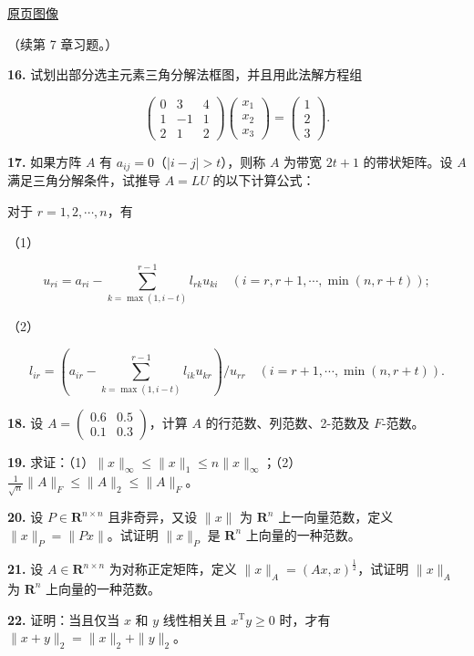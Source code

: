 \documentclass[
  10pt,
  fontset=fandol]{ctexart}
\begin{document}
\href{../../source-images/pdf-214.jpeg}{原页图像}

（续第 7 章习题。）

\textbf{16.} 试划出部分选主元素三角分解法框图，并且用此法解方程组

\[
\begin{pmatrix}0&3&4\\1&-1&1\\2&1&2\end{pmatrix}
\begin{pmatrix}x_1\\x_2\\x_3\end{pmatrix}
=\begin{pmatrix}1\\2\\3\end{pmatrix}.
\]

\textbf{17.} 如果方阵 \(A\) 有 \(a_{ij}=0\)（\(|i-j|>t\)），则称 \(A\) 为带宽 \(2t+1\) 的带状矩阵。设 \(A\) 满足三角分解条件，试推导 \(A=LU\) 的以下计算公式：

对于 \(r=1,2,\cdots,n\)，有

（1）

\[
u_{ri}=a_{ri}-\sum_{k=\max(1,i-t)}^{r-1}l_{rk}u_{ki}\quad(i=r,r+1,\cdots,\min(n,r+t));
\]

（2）

\[
l_{ir}=\left(a_{ir}-\sum_{k=\max(1,i-t)}^{r-1}l_{ik}u_{kr}\right)/u_{rr}\quad(i=r+1,\cdots,\min(n,r+t)).
\]

\textbf{18.} 设 \(A=\begin{pmatrix}0.6&0.5\\0.1&0.3\end{pmatrix}\)，计算 \(A\) 的行范数、列范数、2-范数及 \(F\)-范数。

\textbf{19.} 求证：（1）\(\|x\|_\infty\leqslant\|x\|_1\leqslant n\|x\|_\infty\)；（2）\(\frac1{\sqrt n}\|A\|_F\leqslant\|A\|_2\leqslant\|A\|_F\)。

\textbf{20.} 设 \(P\in\mathbf R^{n\times n}\) 且非奇异，又设 \(\|x\|\) 为 \(\mathbf R^n\) 上一向量范数，定义 \(\|x\|_P=\|Px\|\)。试证明 \(\|x\|_P\) 是 \(\mathbf R^n\) 上向量的一种范数。

\textbf{21.} 设 \(A\in\mathbf R^{n\times n}\) 为对称正定矩阵，定义 \(\|x\|_A=(Ax,x)^{\frac12}\)，试证明 \(\|x\|_A\) 为 \(\mathbf R^n\) 上向量的一种范数。

\textbf{22.} 证明：当且仅当 \(x\) 和 \(y\) 线性相关且 \(x^{\mathrm T}y\geqslant0\) 时，才有 \(\|x+y\|_2=\|x\|_2+\|y\|_2\)。
\end{document}

